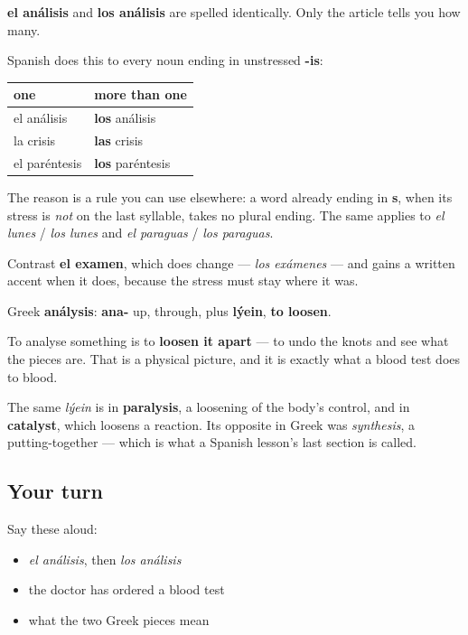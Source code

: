 \begin{grammarlens}[title={Grammar Lens: a noun that does not change}]
\textbf{el análisis} and \textbf{los análisis} are spelled identically. Only the article tells you how many.

Spanish does this to every noun ending in unstressed \textbf{-is}:

\noindent
\begin{tabularx}{\linewidth}{@{}>{\raggedright\arraybackslash}X>{\raggedright\arraybackslash}X@{}}
\toprule
\textbf{one} & \textbf{more than one} \\
\midrule
el análisis & \textbf{los} análisis \\
la crisis & \textbf{las} crisis \\
el paréntesis & \textbf{los} paréntesis \\
\bottomrule
\end{tabularx}

The reason is a rule you can use elsewhere: a word already ending in \textbf{s}, when its stress is \emph{not} on the last syllable, takes no plural ending. The same applies to \emph{el lunes} / \emph{los lunes} and \emph{el paraguas} / \emph{los paraguas}.

Contrast \textbf{el examen}, which does change — \emph{los exámenes} — and gains a written accent when it does, because the stress must stay where it was.
\end{grammarlens}

\begin{cousinweb}
Greek \textbf{análysis}: \textbf{ana-} up, through, plus \textbf{lýein}, \textbf{to loosen}.

To analyse something is to \textbf{loosen it apart} — to undo the knots and see what the pieces are. That is a physical picture, and it is exactly what a blood test does to blood.

The same \emph{lýein} is in \textbf{paralysis}, a loosening of the body's control, and in \textbf{catalyst}, which loosens a reaction. Its opposite in Greek was \emph{synthesis}, a putting-together — which is what a Spanish lesson's last section is called.
\end{cousinweb}

\subsection*{Your turn}
Say these aloud:

\begin{itemize}
\raggedright
  \item \emph{el análisis}, then \emph{los análisis}
  \item the doctor has ordered a blood test
  \item what the two Greek pieces mean
\end{itemize}

